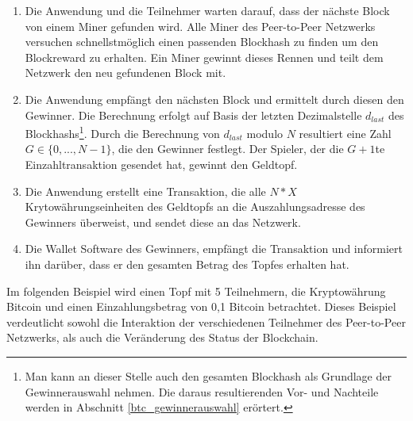 \begin{enumerate}
\item Die Anwendung und die Teilnehmer warten darauf, dass der nächste Block von einem Miner gefunden wird. Alle Miner des Peer-to-Peer Netzwerks versuchen schnellstmöglich einen passenden Blockhash zu finden um den Blockreward zu erhalten. Ein Miner gewinnt dieses Rennen und teilt dem Netzwerk den neu gefundenen Block mit.
\item Die Anwendung empfängt den nächsten Block und ermittelt durch diesen den Gewinner. Die Berechnung erfolgt auf Basis der letzten Dezimalstelle $d_{last}$ des Blockhashs\footnote{Man kann an dieser Stelle auch den gesamten Blockhash als Grundlage der Gewinnerauswahl nehmen. Die daraus resultierenden Vor- und Nachteile werden in Abschnitt \ref{btc_gewinnerauswahl} erörtert.}. Durch die Berechnung von $d_{last}$  modulo $N$ resultiert eine Zahl $G \in \{0,...,N-1\}$, die den Gewinner festlegt. Der Spieler, der die $G+1$te Einzahltransaktion gesendet hat, gewinnt den Geldtopf.
\item Die Anwendung erstellt eine Transaktion, die alle $N*X$ Krytowährungseinheiten des Geldtopfs an die Auszahlungsadresse des Gewinners überweist, und sendet diese an das Netzwerk.
\item Die Wallet Software des Gewinners, empfängt die Transaktion und informiert ihn darüber, dass er den gesamten Betrag des Topfes erhalten hat.
\end{enumerate}

\vspace{1cm}
Im folgenden Beispiel wird einen Topf mit 5 Teilnehmern, die Kryptowährung Bitcoin und einen Einzahlungsbetrag von 0,1 Bitcoin betrachtet. Dieses Beispiel verdeutlicht sowohl die Interaktion der verschiedenen Teilnehmer des Peer-to-Peer Netzwerks, als auch die Veränderung des Status der Blockchain.


